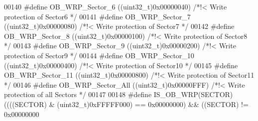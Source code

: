 \begin{DoxyCode}
00140 \textcolor{preprocessor}{#}\textcolor{preprocessor}{define} \textcolor{preprocessor}{OB\_WRP\_Sector\_6}       \textcolor{preprocessor}{(}\textcolor{preprocessor}{(}\textcolor{preprocessor}{uint32\_t}\textcolor{preprocessor}{)}0x00000040\textcolor{preprocessor}{)} \textcolor{comment}{/*!< Write protection of Sector6 */}
00141 \textcolor{preprocessor}{#}\textcolor{preprocessor}{define} \textcolor{preprocessor}{OB\_WRP\_Sector\_7}       \textcolor{preprocessor}{(}\textcolor{preprocessor}{(}\textcolor{preprocessor}{uint32\_t}\textcolor{preprocessor}{)}0x00000080\textcolor{preprocessor}{)} \textcolor{comment}{/*!< Write protection of Sector7 */}
00142 \textcolor{preprocessor}{#}\textcolor{preprocessor}{define} \textcolor{preprocessor}{OB\_WRP\_Sector\_8}       \textcolor{preprocessor}{(}\textcolor{preprocessor}{(}\textcolor{preprocessor}{uint32\_t}\textcolor{preprocessor}{)}0x00000100\textcolor{preprocessor}{)} \textcolor{comment}{/*!< Write protection of Sector8 */}
00143 \textcolor{preprocessor}{#}\textcolor{preprocessor}{define} \textcolor{preprocessor}{OB\_WRP\_Sector\_9}       \textcolor{preprocessor}{(}\textcolor{preprocessor}{(}\textcolor{preprocessor}{uint32\_t}\textcolor{preprocessor}{)}0x00000200\textcolor{preprocessor}{)} \textcolor{comment}{/*!< Write protection of Sector9 */}
00144 \textcolor{preprocessor}{#}\textcolor{preprocessor}{define} \textcolor{preprocessor}{OB\_WRP\_Sector\_10}      \textcolor{preprocessor}{(}\textcolor{preprocessor}{(}\textcolor{preprocessor}{uint32\_t}\textcolor{preprocessor}{)}0x00000400\textcolor{preprocessor}{)} \textcolor{comment}{/*!< Write protection of Sector10 */}
00145 \textcolor{preprocessor}{#}\textcolor{preprocessor}{define} \textcolor{preprocessor}{OB\_WRP\_Sector\_11}      \textcolor{preprocessor}{(}\textcolor{preprocessor}{(}\textcolor{preprocessor}{uint32\_t}\textcolor{preprocessor}{)}0x00000800\textcolor{preprocessor}{)} \textcolor{comment}{/*!< Write protection of Sector11 */}
00146 \textcolor{preprocessor}{#}\textcolor{preprocessor}{define} \textcolor{preprocessor}{OB\_WRP\_Sector\_All}     \textcolor{preprocessor}{(}\textcolor{preprocessor}{(}\textcolor{preprocessor}{uint32\_t}\textcolor{preprocessor}{)}0x00000FFF\textcolor{preprocessor}{)} \textcolor{comment}{/*!< Write protection of all Sectors */}
00147 
00148 \textcolor{preprocessor}{#}\textcolor{preprocessor}{define} \textcolor{preprocessor}{IS\_OB\_WRP}\textcolor{preprocessor}{(}\textcolor{preprocessor}{SECTOR}\textcolor{preprocessor}{)}\textcolor{preprocessor}{(}\textcolor{preprocessor}{(}\textcolor{preprocessor}{(}\textcolor{preprocessor}{(}\textcolor{preprocessor}{SECTOR}\textcolor{preprocessor}{)} \textcolor{preprocessor}{&} \textcolor{preprocessor}{(}\textcolor{preprocessor}{uint32\_t}\textcolor{preprocessor}{)}0xFFFFF000\textcolor{preprocessor}{)} \textcolor{preprocessor}{==} 0x00000000\textcolor{preprocessor}{)} \textcolor{preprocessor}{&&} \textcolor{preprocessor}{(}\textcolor{preprocessor}{(}\textcolor{preprocessor}{SECTOR}\textcolor{preprocessor}{)} \textcolor{preprocessor}{!=} 0x00000000\textcolor{preprocessor}{
}
\end{DoxyCode}
